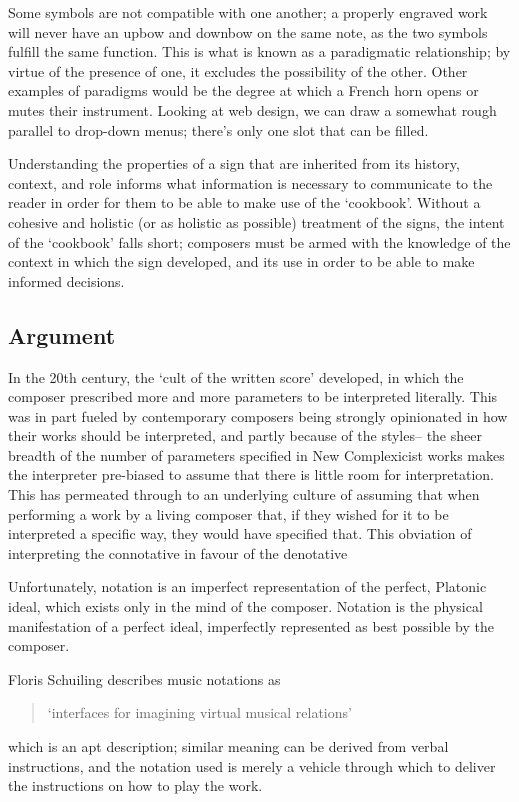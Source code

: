 Some symbols are not compatible with one another; a properly engraved work will never have an upbow and downbow on the same note, as the two symbols fulfill the same function.
This is what is known as a paradigmatic relationship; by virtue of the presence of one, it excludes the possibility of the other.
Other examples of paradigms would be the degree at which a French horn opens or mutes their instrument.
Looking at web design, we can draw a somewhat rough parallel to drop-down menus; there's only one slot that can be filled.

Understanding the properties of a sign that are inherited from its history, context, and role informs what information is necessary to communicate to the reader in order for them to be able to make use of the `cookbook'.
Without a cohesive and holistic (or as holistic as possible) treatment of the signs, the intent of the `cookbook' falls short; composers must be armed with the knowledge of the context in which the sign developed, and its use in order to be able to make informed decisions.

\subsection{Argument}
In the 20th century, the `cult of the written score' developed, in which the composer prescribed more and more parameters to be interpreted literally.\autocite[]{citation very much needed}
This was in part fueled by contemporary composers being strongly opinionated in how their works should be interpreted, and partly because of the styles-- the sheer breadth of the number of parameters specified in New Complexicist works makes the interpreter pre-biased to assume that there is little room for interpretation.
This has permeated through to an underlying culture of assuming that when performing a work by a living composer that, if they wished for it to be interpreted a specific way, they would have specified that.
This obviation of interpreting the connotative in favour of the denotative 

Unfortunately, notation is an imperfect representation of the perfect, Platonic ideal, which exists only in the mind of the composer. 
Notation is the physical manifestation of a perfect ideal, imperfectly represented as best possible by the composer.

Floris Schuiling describes music notations as \begin{quotation}
`interfaces for imagining virtual musical relations'
\end{quotation}
which is an apt description; similar meaning can be derived from verbal instructions, and the notation used is merely a vehicle through which to deliver the instructions on how to play the work.


